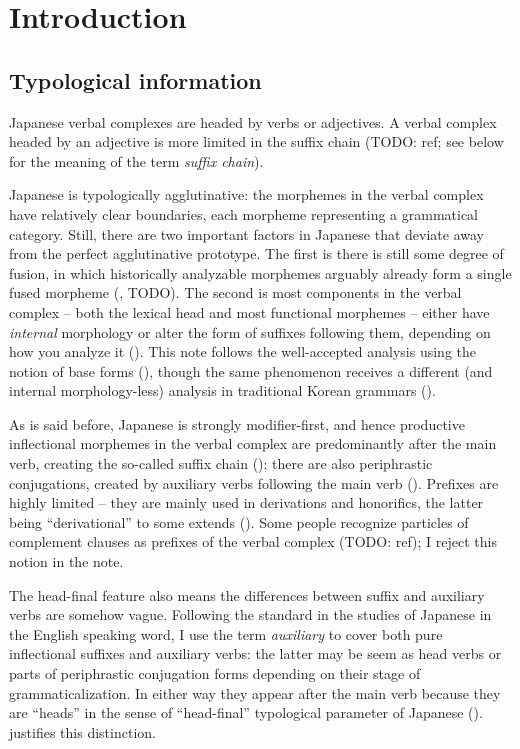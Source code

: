 \documentclass[UTF8, a4paper, oneside, scheme=plain]{ctexrep}
\newcommand*{\term}[1]{\emph{#1}}
\begin{document}
\section{Introduction}

\subsection{Typological information}

Japanese verbal complexes are headed by verbs or adjectives.
A verbal complex headed by an adjective is more limited 
in the suffix chain (TODO: ref; see below for the meaning of the term \term{suffix chain}).

Japanese is typologically agglutinative:
the morphemes in the verbal complex have relatively clear boundaries,
each morpheme representing a grammatical category.
Still, there are two important factors in Japanese that deviate away 
from the perfect agglutinative prototype.
The first is there is still some degree of fusion, 
in which historically analyzable morphemes arguably already form a single fused morpheme 
(, TODO).
The second is most components in the verbal complex 
-- both the lexical head and most functional morphemes --
either have \emph{internal} morphology or alter the form of suffixes following them,
depending on how you analyze it ().
This note follows the well-accepted analysis using the notion of base forms (),
though the same phenomenon receives a different (and internal morphology-less) analysis 
in traditional Korean grammars ().

As is said before, Japanese is strongly modifier-first,
and hence productive inflectional morphemes in the verbal complex 
are predominantly after the main verb,
creating the so-called suffix chain ();
there are also periphrastic conjugations, 
created by auxiliary verbs following the main verb ().
Prefixes are highly limited -- they are mainly used in derivations and honorifics,
the latter being ``derivational'' to some extends ().
Some people recognize particles of complement clauses as prefixes of the verbal complex (TODO: ref);
I reject this notion in the note.

The head-final feature also means the differences between 
suffix and auxiliary verbs are somehow vague.
Following the standard in the studies of Japanese in the English speaking word, 
I use the term \term{auxiliary} to cover both pure inflectional suffixes and auxiliary verbs:
the latter may be seem as head verbs or parts of periphrastic conjugation forms
depending on their stage of grammaticalization.
In either way they appear after the main verb because they are ``heads'' 
in the sense of ``head-final'' typological parameter of Japanese ().
 justifies this distinction.
\end{document}
